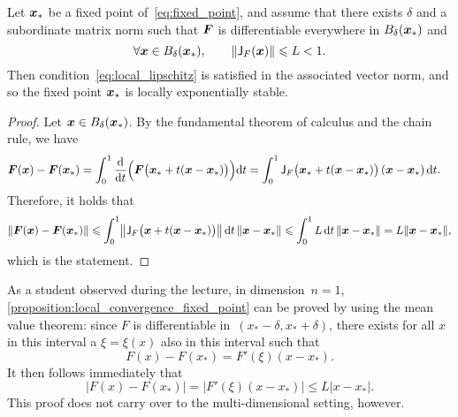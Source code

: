 \begin{proposition}
    \label{proposition:local_convergence_fixed_point}
    Let $\mathbf{\boldsymbol{x}}_*$ be a fixed point of~\eqref{eq:fixed_point},
    and assume that there exists $\delta$ and a subordinate matrix norm such that
    $\mathbf{\boldsymbol{F}}$ is differentiable everywhere in $B_{\delta}(\mathbf{\boldsymbol{x}}_*)$ and
    \[
        \forall \mathbf{\boldsymbol{x}} \in B_{\delta}(\mathbf{\boldsymbol{x}}_*), \qquad
        \lVert\mathsf J_F(\mathbf{\boldsymbol{x}})\rVert \leqslant L < 1.
    \]
    Then condition~\eqref{eq:local_lipschitz} is satisfied in the associated vector norm,
    and so the fixed point $\mathbf{\boldsymbol{x}}_*$ is locally exponentially stable.
\end{proposition}
\begin{proof}
    Let $\mathbf{\boldsymbol{x}} \in B_{\delta}(\mathbf{\boldsymbol{x}}_*)$.
    By the fundamental theorem of calculus and the chain rule,
    we have
    \begin{align*}
        \mathbf{\boldsymbol{F}}(\mathbf{\boldsymbol{x}}) - \mathbf{\boldsymbol{F}}(\mathbf{\boldsymbol{x}}_*)
        &= \int_{0}^{1} \frac{\mathrm d}{\mathrm d t} \Bigl( \mathbf{\boldsymbol{F}}\bigl(\mathbf{\boldsymbol{x}}_* + t(\mathbf{\boldsymbol{x}} - \mathbf{\boldsymbol{x}}_*) \bigr) \Bigr) \mathrm d t
        = \int_{0}^{1} \mathsf J_F\bigl(\mathbf{\boldsymbol{x}}_* + t(\mathbf{\boldsymbol{x}} - \mathbf{\boldsymbol{x}}_*)\bigr) \left(\mathbf{\boldsymbol{x}} - \mathbf{\boldsymbol{x}}_* \right) \mathrm d t.
    \end{align*}
    Therefore,
    it holds that
    \begin{align*}
        \norm{\vect F(\vect x) - \vect F(\vect x_*)}
        \leq \int_{0}^{1} \norm*{\mat J_F\bigl(\vect x + t(\vect x - \vect x_*)\bigr)}  \, \d t \, \norm{\vect x - \vect x_*}
        \leq \int_{0}^{1} L \, \d t \, \norm{\vect x - \vect x_*} = L \norm{\vect x - \vect x_*},
    \end{align*}
    which is the statement.
\end{proof}
\begin{remark}
    As a student observed during the lecture,
    in dimension~$n = 1$, \cref{proposition:local_convergence_fixed_point} can be proved by using the mean value theorem:
    since $F$ is differentiable in~$(x_* -\delta, x_* + \delta)$,
    there exists for all $x$ in this interval a $\xi = \xi(x)$ also in this interval such that
    \[
        F(x) - F(x_*) = F'(\xi) (x - x_*).
    \]
    It then follows immediately that
    \[
        \bigl\lvert F(x) - F(x_*) \bigr\rvert
        = \left\lvert F'(\xi) (x - x_*) \right\rvert
        \leq L \lvert x - x_* \rvert.
    \]
    This proof does not carry over to the multi-dimensional setting, however.
\end{remark}


